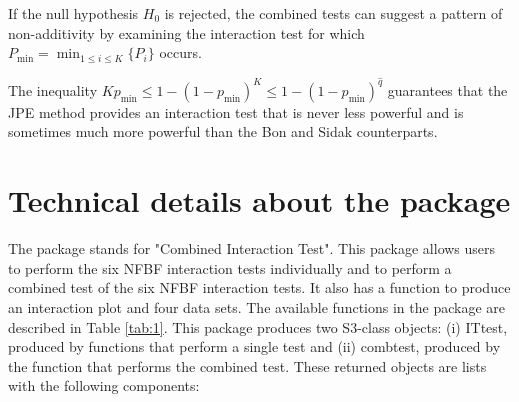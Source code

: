 \noindent {} If the null hypothesis $H_0$ is rejected, the combined tests can suggest a pattern of non-additivity by examining the interaction test for which $P_{\min}=\min_{1 \leq i \leq K} \{ P_i\}$ occurs.

\noindent {} The inequality $K p_{\min} \leq 1-\left(1-p_{\min}\right)^{K} \leq 1-\left(1-p_{\min}\right)^{\hat{q}}$ guarantees that the JPE method provides an interaction test that is never less powerful and is sometimes much more powerful than the Bon and Sidak counterparts. 

\section{Technical details about the  package}
The  package stands for "Combined Interaction Test". This package allows users to perform the six NFBF interaction tests individually and to perform a combined test of the six NFBF interaction tests. It also has a function to produce an interaction plot and four data sets. The available functions in the  package are described in Table \ref{tab:1}. This package produces two S3-class objects: (i) ITtest, produced by functions that perform a single test and (ii) combtest, produced by the function that performs the combined test. These returned objects are lists with the following components: 
